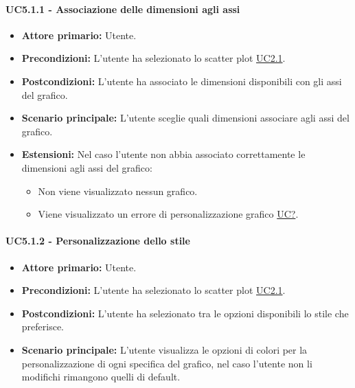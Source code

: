 \paragraph{UC5.1.1 - Associazione delle dimensioni agli assi}
\label{sec:UC5.1.1}
    \begin{itemize}
        \item \textbf{Attore primario:} Utente.
        \item \textbf{Precondizioni:} L'utente ha selezionato lo scatter plot \hyperref[sec:UC2.1]{UC2.1}.
	    \item \textbf{Postcondizioni:} L'utente ha associato le dimensioni disponibili con gli assi del grafico.
	    \item \textbf{Scenario principale:} L'utente sceglie quali dimensioni associare agli assi del grafico.
	    \item \textbf{Estensioni:} Nel caso l'utente non abbia associato correttamente le dimensioni agli assi del grafico:
              \begin{itemize}
                  \item Non viene visualizzato nessun grafico.
                  \item Viene visualizzato un errore di personalizzazione grafico \hyperref[sec:UC - Errore di personalizzazione]{UC?}.
              \end{itemize}
    \end{itemize}
\paragraph{UC5.1.2 - Personalizzazione dello stile}
\label{sec:UC5.1.2}
    \begin{itemize}
        \item \textbf{Attore primario:} Utente.
        \item \textbf{Precondizioni:} L'utente ha selezionato lo scatter plot \hyperref[sec:UC2.1]{UC2.1}.
	    \item \textbf{Postcondizioni:} L'utente ha selezionato tra le opzioni disponibili lo stile che preferisce.
	    \item \textbf{Scenario principale:} L'utente visualizza le opzioni di colori per la personalizzazione di ogni specifica del grafico, nel caso l'utente non li modifichi rimangono quelli di default.
    \end{itemize}

